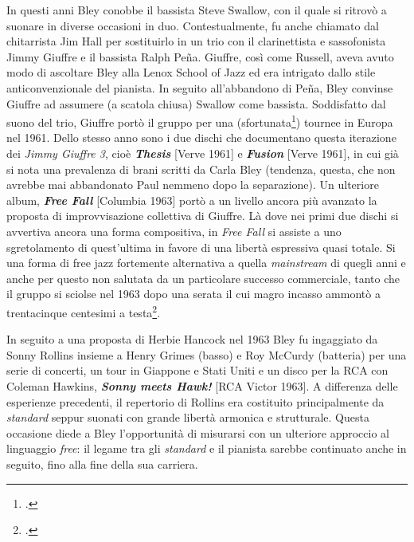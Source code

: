 In questi anni Bley conobbe il bassista Steve Swallow, con il quale si ritrovò a suonare in diverse occasioni in duo. Contestualmente, fu anche chiamato dal chitarrista Jim Hall per sostituirlo in un trio con il clarinettista e sassofonista Jimmy Giuffre e il bassista Ralph Peña. Giuffre, così come Russell, aveva avuto modo di ascoltare Bley alla Lenox School of Jazz ed era intrigato dallo stile anticonvenzionale del pianista. In seguito all'abbandono di Peña, Bley convinse Giuffre ad assumere (a scatola chiusa) Swallow come bassista. Soddisfatto dal suono del trio, Giuffre portò il gruppo per una (sfortunata\footcite[77]{stopping}) tournee in Europa nel 1961. Dello stesso anno sono i due dischi che documentano questa iterazione dei \textit{Jimmy Giuffre 3}, cioè \textit{\textbf{Thesis}} [Verve 1961] e \textit{\textbf{Fusion}} [Verve 1961], in cui già si nota una prevalenza di brani scritti da Carla Bley (tendenza, questa, che non avrebbe mai abbandonato Paul nemmeno dopo la separazione). Un ulteriore album, \textit{\textbf{Free Fall}} [Columbia 1963] portò a un livello ancora più avanzato la proposta di improvvisazione collettiva di Giuffre. Là dove nei primi due dischi si avvertiva ancora una forma compositiva, in \textit{Free Fall} si assiste a uno sgretolamento di quest'ultima in favore di una libertà espressiva quasi totale. Si una forma di free jazz fortemente alternativa a quella \textit{mainstream} di quegli anni e anche per questo non salutata da un particolare successo commerciale, tanto che il gruppo si sciolse nel 1963 dopo una serata il cui magro incasso ammontò a trentacinque centesimi a testa\footcite{hamilton}.\par
In seguito a una proposta di Herbie Hancock nel 1963 Bley fu ingaggiato da Sonny Rollins insieme a Henry Grimes (basso) e Roy McCurdy (batteria) per una serie di concerti, un tour in Giappone e Stati Uniti e un disco per la RCA con Coleman Hawkins, \textit{\textbf{Sonny meets Hawk!}} [RCA Victor 1963]. A differenza delle esperienze precedenti, il repertorio di Rollins era costituito principalmente da \textit{standard} seppur suonati con grande libertà armonica e strutturale. Questa occasione diede a Bley l'opportunità di misurarsi con un ulteriore approccio al linguaggio \textit{free}: il legame tra gli \textit{standard} e il pianista sarebbe continuato anche in seguito, fino alla fine della sua carriera.
